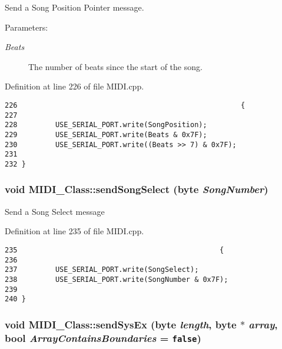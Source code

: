 Send a Song Position Pointer message. \begin{Desc}
\item[Parameters:]
\begin{description}
\item[{\em Beats}]The number of beats since the start of the song. \end{description}
\end{Desc}


Definition at line 226 of file MIDI.cpp.

\begin{Code}\begin{verbatim}226                                                     {
227         
228         USE_SERIAL_PORT.write(SongPosition);
229         USE_SERIAL_PORT.write(Beats & 0x7F);
230         USE_SERIAL_PORT.write((Beats >> 7) & 0x7F);
231         
232 }
\end{verbatim}
\end{Code}


\hypertarget{class_m_i_d_i___class_0b957074192d439e8e69af9eef6fab77}{
\subsubsection[{sendSongSelect}]{\setlength{\rightskip}{0pt plus 5cm}void MIDI\_\-Class::sendSongSelect ({\bf byte} {\em SongNumber})}}
\label{class_m_i_d_i___class_0b957074192d439e8e69af9eef6fab77}


Send a Song Select message 

Definition at line 235 of file MIDI.cpp.

\begin{Code}\begin{verbatim}235                                                {
236         
237         USE_SERIAL_PORT.write(SongSelect);
238         USE_SERIAL_PORT.write(SongNumber & 0x7F);
239         
240 }
\end{verbatim}
\end{Code}


\hypertarget{class_m_i_d_i___class_73a36cacf4e77ca081979f9c7066ee28}{
\subsubsection[{sendSysEx}]{\setlength{\rightskip}{0pt plus 5cm}void MIDI\_\-Class::sendSysEx ({\bf byte} {\em length}, \/  {\bf byte} $\ast$ {\em array}, \/  bool {\em ArrayContainsBoundaries} = {\tt false})}}
\label{class_m_i_d_i___class_73a36cacf4e77ca081979f9c7066ee28}


